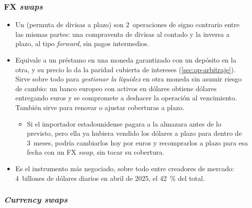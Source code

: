 \documentclass[11pt]{article}
\begin{document}
\subsubsection{FX \emph{swaps}}\label{sec:fx-swaps}

\begin{itemize}
\item Un  (permuta de divisas a plazo) son 2~operaciones de signo contrario entre las mismas partes: una compraventa de divisas al contado y la inversa a plazo, al tipo \emph{forward}, sin pagos intermedios.
\item Equivale a un préstamo en una moneda garantizado con un depósito en la otra, y su precio lo da la paridad cubierta de intereses (\ref{sec:op-arbitraje}). Sirve sobre todo para \emph{gestionar la liquidez} en otra moneda sin asumir riesgo de cambio: un banco europeo con activos en dólares obtiene dólares entregando euros y se compromete a deshacer la operación al vencimiento. También sirve para renovar o ajustar coberturas a plazo.
  \begin{itemize}
  \item Si el importador estadounidense pagara a la almazara antes de lo previsto, pero ella ya hubiera vendido los dólares a plazo para dentro de 3~meses, podría cambiarlos hoy por euros y recomprarlos a plazo para esa fecha con un FX \emph{swap}, sin tocar su cobertura.
  \end{itemize}
\item Es el instrumento más negociado, sobre todo entre creadores de mercado: 4~billones de dólares diarios en abril de 2025, el 42~\% del total\nocite{BIS2026TrienalDatos,HuangKrohnSushko2025FX}.
\end{itemize}

\subsubsection{\emph{Currency swaps}}\label{sec:currency-swaps}
\end{document}
